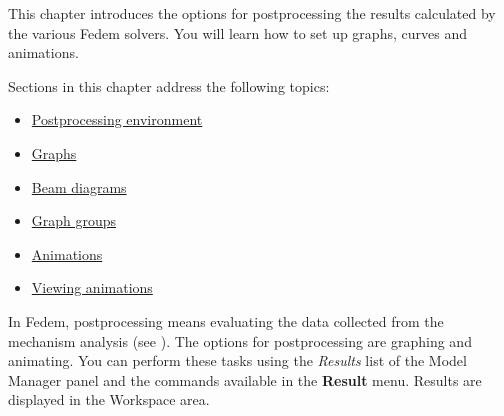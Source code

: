 %
%

%
%


This chapter introduces the options for postprocessing the results calculated by
the various Fedem solvers.
You will learn how to set up graphs, curves and animations.

Sections in this chapter address the following topics:

\begin{itemize}
\item
  \protect\hyperlink{postprocessing-environment}
                    {Postprocessing environment}
\item
  \protect\hyperlink{graphs}
                    {Graphs}
\item
  \protect\hyperlink{beam-diagrams}
                    {Beam diagrams}
\item
  \protect\hyperlink{graph-groups}
                    {Graph groups}
\item
  \protect\hyperlink{animations}
                    {Animations}
\item
  \protect\hyperlink{viewing-animations}
                    {Viewing animations}
\end{itemize}

\clearpage



In Fedem, postprocessing means evaluating the data collected from the mechanism
analysis (see ).
The options for postprocessing are graphing and animating.
You can perform these tasks using the {\sl Results} list of the Model Manager
panel and the commands available in the \textbf{Result} menu.
Results are displayed in the Workspace area.

